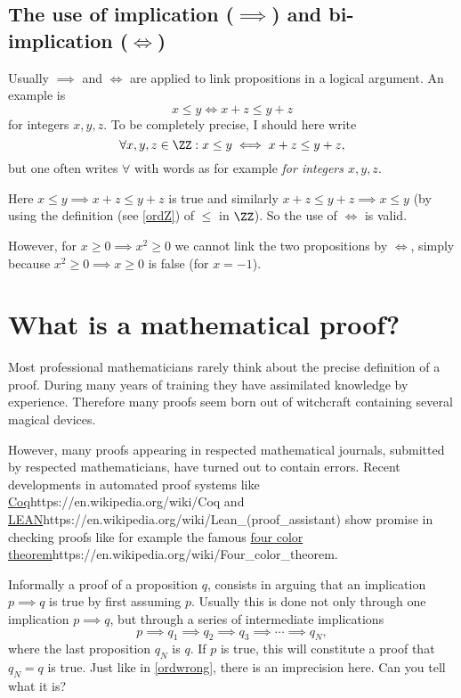 \documentclass{article}
\begin{document}
\subsection{The use of implication ($\implies$) and bi-implication ($\iff$)}

Usually $\implies$ and $\iff$ are applied to link propositions in a logical argument. An example
is
$$
x \leq y \iff x + z \leq y + z
$$
for integers $x, y, z$. To be completely precise, I should here write
$$
\forall x, y, z\in \ZZ: x \leq y \iff x + z \leq y + z,
$$
but one often writes $\forall$ with words as for example \emph{for integers $x, y, z$}.


Here $x \leq y\implies x + z \leq y + z$ is true and similarly
$x + z \leq y + z \implies x \leq y$ (by using the definition (see \eqref{ordZ}) of $\leq$ in $\ZZ$). So the
use of $\iff$ is valid.

However, for $x \geq 0 \implies x^2 \geq 0$ we cannot link the two propositions by $\iff$,
simply because $x^2 \geq 0 \implies x \geq 0$ is false (for $x= -1$).


\section{What is a mathematical proof?}


Most professional mathematicians rarely think about the precise
definition of a proof. During many years of training they have
assimilated knowledge by experience. Therefore many proofs
seem born out of witchcraft containing several magical
devices.

However, many proofs appearing in
respected mathematical journals, submitted by respected mathematicians, have turned out to contain
errors. Recent developments in automated proof systems
like \url{Coq}{https://en.wikipedia.org/wiki/Coq} and \url{LEAN}{https://en.wikipedia.org/wiki/Lean_(proof_assistant)} show
promise in checking proofs like for example the famous
\url{four color theorem}{https://en.wikipedia.org/wiki/Four_color_theorem}.

Informally a proof of a proposition $q$, consists in arguing that an implication $p\implies q$ is true by first assuming $p$. Usually this is done
not only through one implication $p\implies q$, but through a series
of intermediate implications
$$
p\implies q_1 \implies q_2 \implies q_3 \implies \cdots \implies q_N,
$$
where the last proposition $q_N$ is $q$. If $p$ is true, this
will constitute a proof that $q_N = q$ is true. Just like in \eqref{ordwrong},
there is an imprecision here. Can you tell what it is?
\end{document}
